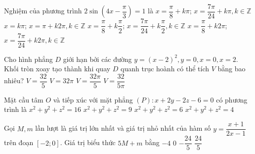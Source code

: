 \begin{ex}%
Nghiệm của phương trình $2\sin \left(4x - \dfrac{\pi}{3}\right) = 1$ là
\choice
{$x = \dfrac{\pi}{8} + k\pi$; $x = \dfrac{7\pi}{24} + k\pi, k \in \mathbb{Z}$ } 
{$x=k\pi$; $x = \pi + k2\pi, k \in \mathbb{Z}$} 	
{\True $x = \dfrac{\pi}{8} + k\dfrac{\pi}{2}$; $x = \dfrac{7\pi}{24} + k\dfrac{\pi}{2}, k \in \mathbb{Z}$} 	
{$x = \dfrac{\pi}{8} + k2\pi$; $x = \dfrac{7\pi}{24} + k2\pi, k \in \mathbb{Z}$}
\end{ex}	
\begin{ex}%
	Cho hình phẳng $D$ giới hạn bởi các đường $y= (x-2)^2, y= 0, x= 0, x= 2$. Khối tròn xoay tạo thành khi quay $D$ quanh trục hoành có thể tích $V$ bằng bao nhiêu?
	\choice
	{$V= \dfrac{32}{5}$}
	{$V= 32 \pi$}
	{\True $V= \dfrac{32 \pi}{5}$}
	{$V= \dfrac{32}{5 \pi}$}
\end{ex}
\begin{ex}%
Mặt cầu tâm $O$ và tiếp xúc với mặt phẳng $(P): x+2y-2z-6=0$ có phương trình là
\choice
{$x^2+y^2+z^2=16$}
{$x^2+y^2+z^2=9$}
{$x^2+y^2+z^2=6$}
{\True $x^2+y^2+z^2=4$}
\end{ex}

\begin{ex}%
Gọi $M,m$ lần lượt là giá trị lớn nhất và giá trị nhỏ nhất của hàm số $y=\dfrac{x+1}{2x-1}$ trên đoạn $[-2;0]$. Giá trị biểu thức $5M+m$ bằng
\choice
{$-4$}
{\True $0$}
{$-\dfrac{24}{5}$}
{$\dfrac{24}{5}$}
\end{ex}

